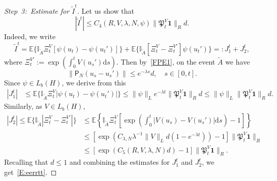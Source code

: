 \documentclass[10pt]{amsart}
\theoremstyle{definition}\newtheorem{defi}[theo]{Definition}\newtheorem{rema}[theo]{Remark}\newtheorem{exam}[theo]{Example}\newtheorem{exem}[theo]{Example}\newtheorem{nota}[theo]{Notation}
\newcommand{\I}{{\mathbb I}}
\newcommand{\E}{{\mathbb E}}
\newcommand{\la}{\lambda}
\newcommand{\pp}{{{\mathsf P}_N}}
\newcommand{\PPPP}{{\mathfrak P}}
\newcommand{\dd}{\mathrm{d}}
\newenvironment{step}{\begin{proof}}{\let\qed\relax \end{proof}}
\begin{document}
\begin{step}[Step~3:~Estimate for $\tilde I^t$]
Let us show that
\begin{equation}\label{E:eerrtt}
|\tilde I^{t}|\le C_{4}(R,V,\la,N, \psi) \|\PPPP_t^V{\mathbf1}\|_R d.
\end{equation}
Indeed, we write
\[
\tilde I^t =\E\bigl\{\I_{\tilde A}\Xi^V_t[\psi (u_t)-\psi (u_t')] \bigr\}+\E\bigl\{\I_{\tilde A}[\Xi^V_t-\Xi^{V'}_t]\psi (u_t') \bigr\} =:J_1^t+J_2^t,
\]
where $\Xi^{V'}_t:=\exp\left(\int_{0}^tV(u_s') \dd s\right)$. Then by~\eqref{FPE1}, on the event $\tilde A$ we have
\[
\|\pp(u_s-u_s')\|
\le e^{-\lambda s}d, \quad s\in [0,t].
\]
Since $\psi\in L_b(H) $, we derive from this
\begin{align*}
|J_{1}^t|&\le \E\bigl\{\I_{\tilde A} \Xi^V_t| \psi (u_t)-\psi (u_t')| \bigr\} \le \| \psi\|_{L} e^{-\lambda t} \|\PPPP_t^V{\mathbf1}\|_R d \le \| \psi\|_{L} \|\PPPP_t^V{\mathbf1}\|_Rd.
\end{align*}
Similarly, as $V\in L_b(H)$,
\begin{align*}
|J_{2}^t| \le \E\bigl\{\I_{\tilde A}|\Xi^V_t-\Xi^{V'}_t| \bigr\} &\le \E\left\{\I_{\tilde A}\Xi^V_t \left[\exp\left(\int_{0}^t|V(u_s)-V(u_s')| \dd s\right)-1 \right] \right\}\\&\le \left[\exp\left(C_{\la,N} \lambda^{-1} \|V\|_{L} d (1-e^{-\lambda t})\right)-1 \right] \|\PPPP_t^V{\mathbf1}\|_R\\&\le \left[\exp\left(C_5(R,V,\la,N) d \right)-1 \right] \|\PPPP_t^V{\mathbf1}\|_R.
\end{align*}
Recalling that $d\le1$ and combining the estimates for $J_{1}^t$ and $J_{2}^t$, we get~\eqref{E:eerrtt}.
\end{step}
\end{document}
